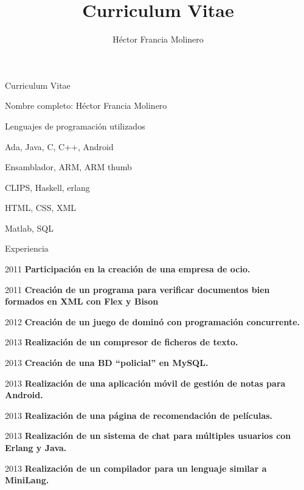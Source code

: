 \documentclass[letterpaper,12pt]{article}
\title{Curriculum Vitae}
\author{Héctor Francia Molinero }
\begin{document}
\setlength{\cvlabelwidth}{40mm}  %

\begin{cv}{Curriculum Vitae}


Nombre completo: Héctor Francia Molinero


\begin{cvlist}{Lenguajes de programación utilizados}
\item Ada, Java, C, C++, Android
\item Ensamblador, ARM, ARM thumb
\item CLIPS, Haskell, erlang
\item HTML, CSS, XML
\item Matlab, SQL
\end{cvlist}

\begin{cvlist}{Experiencia}

	\item[2011] \textbf{Participación en la creación de una empresa de ocio.}\\
	
	\item[2011] \textbf{Creación de un programa para verificar documentos bien formados en XML con Flex y 			Bison}\\

	\item[2012] \textbf{Creación de un juego de dominó con programación concurrente.}\\
	
	\item[2013] \textbf{Realización de un compresor de ficheros de texto.}\\
	
	\item[2013] \textbf{Creación de una BD ``policial'' en MySQL.}\\
	
	\item[2013] \textbf{Realización de una aplicación móvil de gestión de notas para Android.}\\

	\item[2013] \textbf{Realización de una página de recomendación de películas.}\\
	
	\item[2013] \textbf{Realización de un sistema de chat para múltiples usuarios con Erlang y Java.}
	
	\item[2013] \textbf{Realización de un compilador para un lenguaje similar a MiniLang.}
	

\end{cvlist}
\end{cv}
\end{document}
